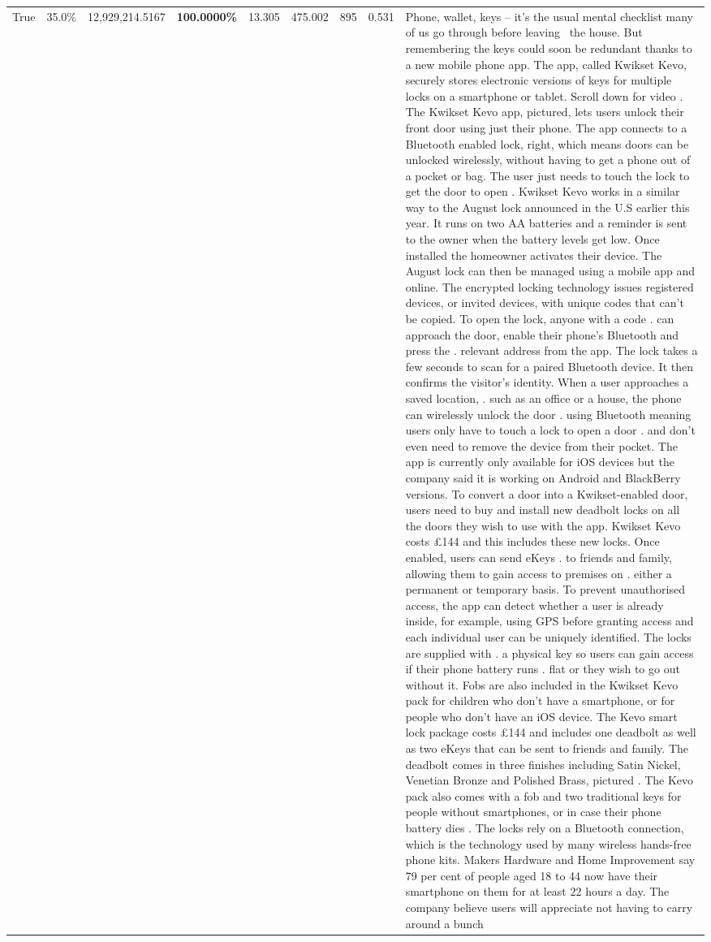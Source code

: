 \begin{table}[H]
\begin{tabular}{lllrlllll}
True & 35.0\% & 12,929,214.5167 & \bfseries \color{red} 100.0000\% & 13.305 & 475.002 & 895 & 0.531 & Phone, wallet, keys – it’s the usual mental checklist many of us go through before leaving  the house. But remembering the keys could soon be redundant thanks to a new mobile phone app. The app, called Kwikset Kevo, securely stores electronic versions of keys for multiple locks on a smartphone or tablet. Scroll down for video . The Kwikset Kevo app, pictured, lets users unlock their front door using just their phone. The app connects to a Bluetooth enabled lock, right, which means doors can be unlocked wirelessly, without having to get a phone out of a pocket or bag. The user just needs to touch the lock to get the door to open . Kwikset Kevo works in a similar way to the August lock announced in the U.S earlier this year. It runs on two AA batteries and a reminder is sent to the owner when the battery levels get low. Once installed the homeowner activates their device. The August lock can then be managed using a mobile app and online. The encrypted locking technology issues registered devices, or invited devices, with unique codes that can't be copied. To open the lock, anyone with a code . can approach the door, enable their phone's Bluetooth and press the . relevant address from the app. The lock takes a few seconds to scan for a paired Bluetooth device. It then confirms the visitor's identity. When a user approaches a saved location, . such as an office or a house, the phone can wirelessly unlock the door . using Bluetooth meaning users only have to touch a lock to open a door . and don't even need to remove the device from their pocket. The app is currently only available for iOS devices but the company said it is working on Android and BlackBerry versions. To convert a door into a Kwikset-enabled door, users need to buy and install new deadbolt locks on all the doors they wish to use with the app. Kwikset Kevo costs £144 and this includes these new locks. Once enabled, users can send eKeys . to friends and family, allowing them to gain access to premises on . either a permanent or temporary basis. To prevent unauthorised access, the app can detect whether a user is already inside, for example, using GPS before granting access and each individual user can be uniquely identified. The locks are supplied with . a physical key so users can gain access if their phone battery runs . flat or they wish to go out without it. Fobs are also included in the Kwikset Kevo pack for children who don't have a smartphone, or for people who don't have an iOS device. The Kevo smart lock package costs £144 and includes one deadbolt as well as two eKeys that can be sent to friends and family. The deadbolt comes in three finishes including Satin Nickel, Venetian Bronze and Polished Brass, pictured . The Kevo pack also comes with a fob and two traditional keys for people without smartphones, or in case their phone battery dies . The locks rely on a Bluetooth connection, which is the technology used by many wireless hands-free phone kits. Makers Hardware and Home Improvement say 79 per cent of people aged 18 to 44 now have their smartphone on them for at least 22 hours a day. The company believe users will appreciate not having to carry around a bunch 
\end{tabular}
\end{table}
